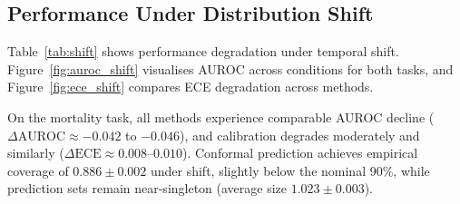 \documentclass[11pt,a4paper]{article}
\newcommand{\ECE}{\mathrm{ECE}}
\begin{document}
\begin{table}[htbp]
\centering
\caption{In-distribution performance. Mean $\pm$ SD across five runs. Bold indicates best value per metric per task. $\downarrow$ lower is better; $\uparrow$ higher is better.}
\label{tab:iid}
\end{table}

\subsection{Performance Under Distribution Shift}

Table~\ref{tab:shift} shows performance degradation under temporal shift. Figure~\ref{fig:auroc_shift} visualises AUROC across conditions for both tasks, and Figure~\ref{fig:ece_shift} compares ECE degradation across methods.

On the mortality task, all methods experience comparable AUROC decline ($\Delta\mathrm{AUROC} \approx -0.042$ to $-0.046$), and calibration degrades moderately and similarly ($\Delta\ECE \approx 0.008$--$0.010$). Conformal prediction achieves empirical coverage of $0.886 \pm 0.002$ under shift, slightly below the nominal 90\%, while prediction sets remain near-singleton (average size $1.023 \pm 0.003$).
\end{document}
